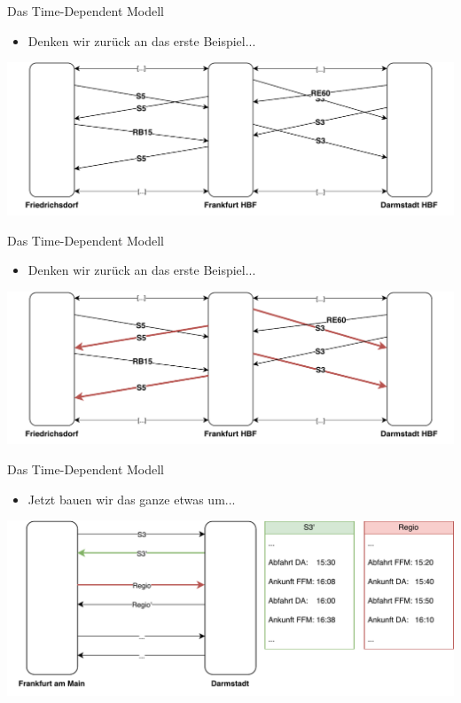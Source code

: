 \begin{frame}{Das Time-Dependent Modell}
	\begin{itemize}
		\item Denken wir zurück an das erste Beispiel...
	\end{itemize}

	\begin{center}
		\includegraphics[width=\linewidth]{images/simple-approach-timed.pdf}
	\end{center}
\end{frame}


\begin{frame}{Das Time-Dependent Modell}
	\begin{itemize}
		\item Denken wir zurück an das erste Beispiel...
	\end{itemize}

	\begin{center}
		\includegraphics[width=\linewidth]{images/simple-approach-timed-3.pdf}
	\end{center}
\end{frame}


\begin{frame}{Das Time-Dependent Modell}
	\begin{itemize}
		\item Jetzt bauen wir das ganze etwas um...
	\end{itemize}

	\begin{center}
		\includegraphics[width=\linewidth]{images/time-dependent/basic.pdf}
	\end{center}
\end{frame}

